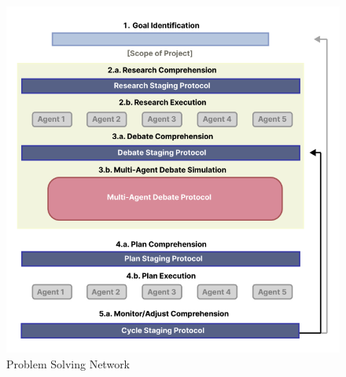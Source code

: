 \documentclass{beamer}
\begin{document}
\begin{frame}
\begin{columns}[T]
\begin{column}{0.5\textwidth}
        \begin{figure}
            \centering
            \includegraphics[width=\textwidth]{MAD-stages.png}
            \caption{Problem Solving Network}
        \end{figure}
    \end{column}

\end{columns}
\end{frame}


\end{document}
